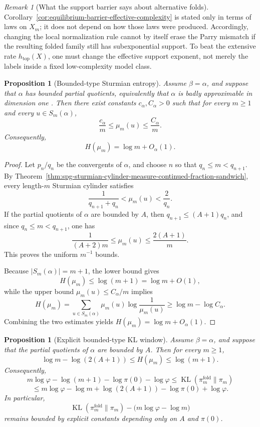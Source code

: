 \documentclass[11pt,letterpaper]{article}
\numberwithin{equation}{section}
\theoremstyle{plain}
\newtheorem{proposition}[theorem]{Proposition}
\theoremstyle{definition}
\theoremstyle{remark}
\newtheorem{remark}[theorem]{Remark}
\DeclareMathOperator{\KL}{KL}
\begin{document}
\begin{remark}[What the support barrier says about alternative folds]
\label{rem:alternative-folds-support-barrier}
Corollary~\ref{cor:equilibrium-barrier-effective-complexity} is stated only in
terms of laws on \(X_m\); it does not depend on how those laws were produced.
Accordingly, changing the local normalization rule cannot by itself erase the
Parry mismatch if the resulting folded family still has subexponential support.
To beat the extensive rate \(h_{\mathrm{top}}(X)\), one must change the
effective support exponent, not merely the labels inside a fixed low-complexity
model class.
\end{remark}

\begin{proposition}[Bounded-type Sturmian entropy]\label{prop:bounded-type-sturmian-entropy}
Assume \(\beta=\alpha\), and suppose that \(\alpha\) has bounded partial
quotients, equivalently that \(\alpha\) is badly approximable in dimension one
\cite{Cassels1957,Schmidt1969BadlyApproximableSystems}. Then there exist
constants \(c_\alpha,C_\alpha>0\) such that for
every \(m\ge 1\) and every \(u\in S_m(\alpha)\),
\[
\frac{c_\alpha}{m}\le \mu_m(u)\le \frac{C_\alpha}{m}.
\]
Consequently,
\[
H(\mu_m)=\log m+O_\alpha(1).
\]
\end{proposition}

\begin{proof}
Let \(p_n/q_n\) be the convergents of \(\alpha\), and choose \(n\) so that
\(q_n\le m<q_{n+1}\). By
Theorem~\ref{thm:spg-sturmian-cylinder-measure-continued-fraction-sandwich},
every length-\(m\) Sturmian cylinder satisfies
\[
\frac{1}{q_{n+1}+q_n}<\mu_m(u)<\frac{2}{q_n}.
\]
If the partial quotients of \(\alpha\) are bounded by \(A\), then
\(q_{n+1}\le (A+1)q_n\), and since \(q_n\le m<q_{n+1}\), one has
\[
\frac{1}{(A+2)m}\le \mu_m(u)\le \frac{2(A+1)}{m}.
\]
This proves the uniform \(m^{-1}\) bounds.

Because \(|S_m(\alpha)|=m+1\), the lower bound gives
\[
H(\mu_m)\le \log(m+1)=\log m+O(1),
\]
while the upper bound \(\mu_m(u)\le C_\alpha/m\) implies
\[
H(\mu_m)
=
\sum_{u\in S_m(\alpha)}\mu_m(u)\log\frac1{\mu_m(u)}
\ge
\log m-\log C_\alpha.
\]
Combining the two estimates yields \(H(\mu_m)=\log m+O_\alpha(1)\).
\end{proof}

\begin{proposition}[Explicit bounded-type KL window]\label{prop:explicit-bounded-type-kl-window}
Assume \(\beta=\alpha\), and suppose that the partial quotients of \(\alpha\)
are bounded by \(A\). Then for every \(m\ge 1\),
\[
\log m-\log(2(A+1))
\le
H(\mu_m)
\le
\log(m+1).
\]
Consequently,
\[
m\log\varphi-\log(m+1)-\log\pi(0)-\log\varphi
\le
\KL(\pi_m^{\mathrm{fold}}\|\pi_m)
\]
\[
\le
m\log\varphi-\log m+\log(2(A+1))-\log\pi(0)+\log\varphi.
\]
In particular,
\[
\KL(\pi_m^{\mathrm{fold}}\|\pi_m)
-
\bigl(m\log\varphi-\log m\bigr)
\]
remains bounded by explicit constants depending only on \(A\) and \(\pi(0)\).
\end{proposition}
\end{document}
